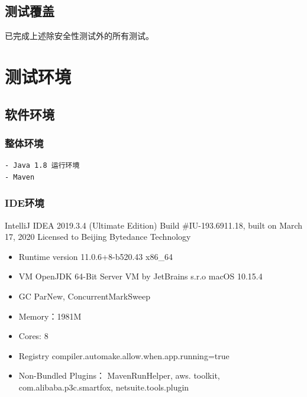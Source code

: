 \documentclass[hyperref, a4paper]{ctexart}
\providecommand{\tightlist}{%
  \setlength{\itemsep}{0pt}\setlength{\parskip}{0pt}}
\begin{document}
\hypertarget{ux6d4bux8bd5ux8986ux76d6}{%
\subsection{测试覆盖}\label{ux6d4bux8bd5ux8986ux76d6}}

已完成上述除安全性测试外的所有测试。

\hypertarget{ux6d4bux8bd5ux73afux5883}{%
\section{测试环境}\label{ux6d4bux8bd5ux73afux5883}}

\hypertarget{ux8f6fux4ef6ux73afux5883}{%
\subsection{软件环境}\label{ux8f6fux4ef6ux73afux5883}}

\hypertarget{ux6574ux4f53ux73afux5883}{%
\subsubsection{整体环境}\label{ux6574ux4f53ux73afux5883}}

\begin{verbatim}
- Java 1.8 运行环境
- Maven
\end{verbatim}

\hypertarget{ideux73afux5883}{%
\subsubsection{IDE环境}\label{ideux73afux5883}}

IntelliJ IDEA 2019.3.4 (Ultimate Edition) Build \#IU-193.6911.18, built
on March 17, 2020 Licensed to Beijing Bytedance Technology

\begin{itemize}
\tightlist
\item
  Runtime version 11.0.6+8-b520.43 x86\_64
\item
  VM OpenJDK 64-Bit Server VM by JetBrains s.r.o macOS 10.15.4
\item
  GC ParNew, ConcurrentMarkSweep
\item
  Memory：1981M
\item
  Cores: 8
\item
  Registry compiler.automake.allow.when.app.running=true
\item
  Non-Bundled Plugins： MavenRunHelper, aws. toolkit,
  com.alibaba.p3c.smartfox, netsuite.tools.plugin
\end{itemize}
\end{document}
